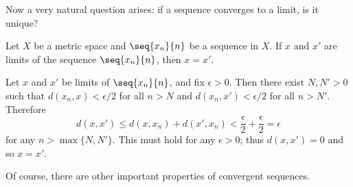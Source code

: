 Now a very natural question arises:
if a sequence converges to a limit, is it unique?

\begin{observation}
    \label{obv:uniqlim}
    Let \(X\) be a metric space
    and \(\seq{x_n}{n}\) be a sequence in \(X\).
    If \(x\) and \(x'\) are limits of the sequence \(\seq{x_n}{n}\),
    then \(x=x'\).
\end{observation}
\begin{myproof}
    Let \(x\) and \(x'\) be limits of \(\seq{x_n}{n}\),
    and fix \(\epsilon>0\).
    Then there exist \(N,N'>0\) such that
    \(d(x_n,x)<\epsilon/2\) for all \(n>N\)
    and \(d(x_n,x')<\epsilon/2\) for all \(n>N'\).
    Therefore
    \[
        d(x,x')
        \le d(x,x_n)+d(x',x_n)
        <\frac{\epsilon}{2}+\frac{\epsilon}{2}
        =\epsilon
    \]
    for any \(n>\max\{N,N'\}\).
    This must hold for any \(\epsilon>0\);
    thus \(d(x,x')=0\) and so \(x=x'\).
\end{myproof}

Of course, there are other important properties of convergent sequences.

